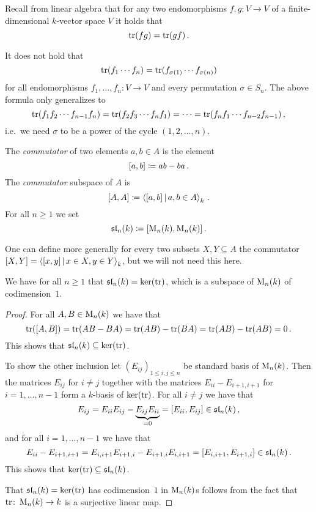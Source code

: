 \begin{recall}
  Recall from linear algebra that for any two endomorphisms $f, g \colon V \to V$ of a finite-dimensional $k$-vector space $V$ it holds that
  \[
    \operatorname{tr}(fg) = \operatorname{tr}(gf) \,.
  \]
\end{recall}


\begin{warning}
  It does not hold that
  \[
      \operatorname{tr}(f_1 \dotsm f_n)
    = \operatorname{tr}(f_{\sigma(1)} \dotsm f_{\sigma(n)})
  \]
  for all endomorphisms $f_1, \dotsc, f_n \colon V \to V$ and every permutation $\sigma \in S_n$.
  The above formula only generalizes to
  \[
      \operatorname{tr}(f_1 f_2 \dotsm f_{n-1} f_n)
    = \operatorname{tr}(f_2 f_3 \dotsm f_n f_1)
    = \dotsb
    = \operatorname{tr}(f_n f_1 \dotsm f_{n-2} f_{n-1}) \,,
  \]
  i.e.\ we need $\sigma$ to be a power of the cycle $(1,2,\dotsc,n)$.
\end{warning}


\begin{definition}
  The \emph{commutator} of two elements $a, b \in A$ is the element
  \[
              [a,b]
    \coloneqq  ab - ba \,.
  \]
  The \emph{commutator} subspace of $A$ is
  \[
              [A,A]
    \defined  \gen{ [a,b] \suchthat a, b \in A }_k \,.
  \]
  For all $n \geq 1$ we set
  \[
              \operatorname{\mathfrak{sl}}_n(k)
    \coloneqq  [ \operatorname{M}_n(k), \operatorname{M}_n(k) ] \,.
  \]
\end{definition}


\begin{remark}
  One can define more generally for every two subsets $X, Y \subseteq A$ the commutator $[X, Y] = \gen{ [x,y] \suchthat x \in X, y \in Y}_k$, but we will not need this here.
\end{remark}


\begin{lemma}
  We have for all $n \geq 1$ that $\operatorname{\mathfrak{sl}}_n(k) = \ker(\operatorname{tr})$, which is a subspace of $\operatorname{M}_n(k)$ of codimension~$1$.
\end{lemma}


\begin{proof}
  For all $A, B \in \operatorname{M}_n(k)$ we have that
  \[
      \operatorname{tr}( [A,B] )
    = \operatorname{tr}(AB - BA)
    = \operatorname{tr}(AB) - \operatorname{tr}(BA)
    = \operatorname{tr}(AB) - \operatorname{tr}(AB)
    = 0 \,.
  \]
  This shows that $\operatorname{\mathfrak{sl}}_n(k) \subseteq \ker(\operatorname{tr})$.
  
  To show the other inclusion let $(E_{ij})_{1 \leq i,j \leq n}$ be standard basis of $\operatorname{M}_n(k)$.
  Then the matrices $E_{ij}$ for $i \neq j$ together with the matrices $E_{ii} - E_{i+1,i+1}$ for $i = 1, \dotsc, n-1$ form a $k$-basis of $\ker(\operatorname{tr})$.
  For all  $i \neq j$ we have that
  \[
        E_{ij}
    =   E_{ii} E_{ij} - \underbrace{E_{ij} E_{ii}}_{=0}
    =   [E_{ii}, E_{ij}]
    \in \operatorname{\mathfrak{sl}}_n(k) \,,
  \]
  and for all $i = 1, \dotsc, n-1$ we have that
  \[
        E_{ii} - E_{i+1,i+1}
    =   E_{i,i+1} E_{i+1,i} - E_{i+1,i} E_{i,i+1}
    =   [E_{i,i+1}, E_{i+1,i}]
    \in \operatorname{\mathfrak{sl}}_n(k) \,.
  \]
  This shows that $\ker(\operatorname{tr}) \subseteq \operatorname{\mathfrak{sl}}_n(k)$.
  
  That $\operatorname{\mathfrak{sl}}_n(k) = \ker(\operatorname{tr})$ has codimension~$1$ in $\operatorname{M}_n(k)$s follows from the fact that $\operatorname{tr} \colon \operatorname{M}_n(k) \to k$ is a surjective linear map.
\end{proof}


